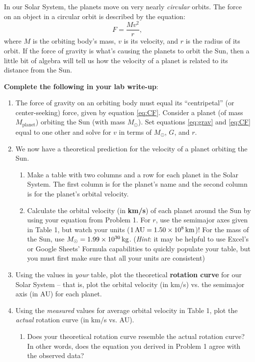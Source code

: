 \documentclass[11pt]{article}%
\begin{document}
In our Solar System, the planets move on very nearly \emph{circular} orbits. The force on an object in a circular orbit is described by the equation:
\begin{equation} \label{eq:CF}
F = \frac{M v^2}{r},
\end{equation}
where $M$ is the orbiting body's mass, $v$ is its velocity, and $r$ is the radius of its orbit. If the force of gravity is what's causing the planets to orbit the Sun, then a little bit of algebra will tell us how the velocity of a planet is related to its distance from the Sun.

\textbf{Complete the following in your lab write-up}:

\begin{enumerate}
    \item The force of gravity on an orbiting body must equal its ``centripetal'' (or center-seeking) force, given by equation \ref{eq:CF}. Consider a planet (of mass $M_{\textrm{planet}}$) orbiting the Sun (with mass $M_\odot$). Set equations \ref{eq:grav} and \ref{eq:CF} equal to one other and solve for $v$ in terms of $M_{\odot}$, $G$, and $r$.
    
    \item We now have a theoretical prediction for the velocity of a planet orbiting the Sun.
    \begin{enumerate}
        \item Make a table with two columns and a row for each planet in the Solar System. The first column is for the planet's name and the second column is for the planet's orbital velocity. 
        
        \item Calculate the orbital velocity (in \textbf{km/s}) of each planet around the Sun by using your equation from Problem 1. For $r$, use the semimajor axes given in Table 1, but watch your units ($1 \, {\rm AU} = 1.50 \times 10^8 \, {\rm km}$)! For the mass of the Sun, use $M_\odot = 1.99 \times 10^{30} \, {\rm kg}$. (\emph{Hint}: it may be helpful to use Excel's or Google Sheets' Formula capabilities to quickly populate your table, but you must first make sure that all your units are consistent)
    \end{enumerate}
    
    \item Using the values in \emph{your} table, plot the theoretical \textbf{rotation curve} for our Solar System -- that is, plot the orbital velocity (in km/s) vs. the semimajor axis (in AU) for each planet. 
    
    \item Using the \emph{measured} values for average orbital velocity in Table 1, plot the \emph{actual} rotation curve (in km/s vs. AU). 
    \begin{enumerate}
        \item Does your theoretical rotation curve resemble the actual rotation curve? In other words, does the equation you derived in Problem 1 agree with the observed data?
    \end{enumerate}
\end{enumerate}
\end{document}
